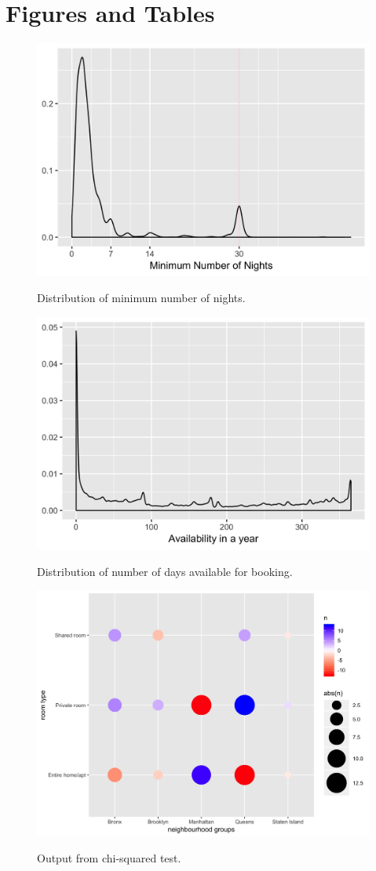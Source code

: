 \documentclass[10pt]{jmlr}%
\begin{document}
\newpage %
\begin{thebibliography}{99} %
	
	
	
\end{thebibliography}


\newpage
\appendix

\section{Figures and Tables}
\label{appendix:fig}

\begin{figure}[htbp]
	\centering
	\caption{Distribution of minimum number of nights.}
	\includegraphics[width=0.5\linewidth]{length_stay_density.jpeg}
	\label{fig:length_stay_density}
\end{figure}

\begin{figure}[htbp]
	\centering
	\caption{Distribution of number of days available for booking.}
	\includegraphics[width=0.5\linewidth]{availability_density.jpeg}
	\label{fig:availability_density}
\end{figure}

\begin{figure}[htbp]
	\centering
	\caption{Output from chi-squared test.}
	\includegraphics[width=0.5\linewidth]{room_type.jpeg}
	\label{fig:room_type}
\end{figure}
\end{document}
